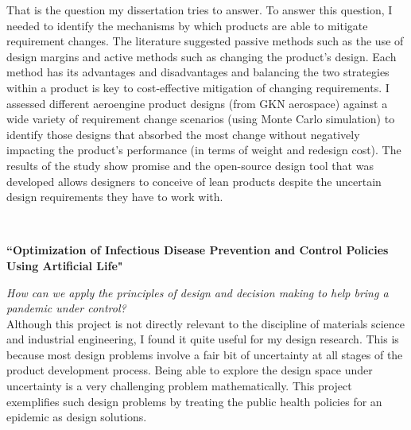 \documentclass[10pt]{article} %
\begin{document}
That is the question my dissertation tries to answer. To answer this question, I needed to identify the mechanisms by which products are able to mitigate requirement changes. The literature suggested passive methods such as the use of design margins and active methods such as changing the product's design. Each method has its advantages and disadvantages and balancing the two strategies within a product is key to cost-effective mitigation of changing requirements. I assessed different aeroengine product designs (from GKN aerospace) against a wide variety of requirement change scenarios (using Monte Carlo simulation) to identify those designs that absorbed the most change without negatively impacting the product's performance (in terms of weight and redesign cost). The results of the study show promise and the open-source design tool that was developed allows designers to conceive of lean products despite the uncertain design requirements they have to work with.

~
~
~
~
~
~
~
~
~


\medskip %

{\raggedright\textbf{``Optimization of Infectious Disease Prevention and Control Policies Using Artificial Life"}}
\textit{\center How can we apply the principles of design and decision making to help bring a pandemic under control?}\\

Although this project is not directly relevant to the discipline of materials science and industrial engineering, I found it quite useful for my design research. This is because most design problems involve a fair bit of uncertainty at all stages of the product development process. Being able to explore the design space under uncertainty is a very challenging problem mathematically. This project exemplifies such design problems by treating the public health policies for an epidemic as design solutions. 
\end{document}
